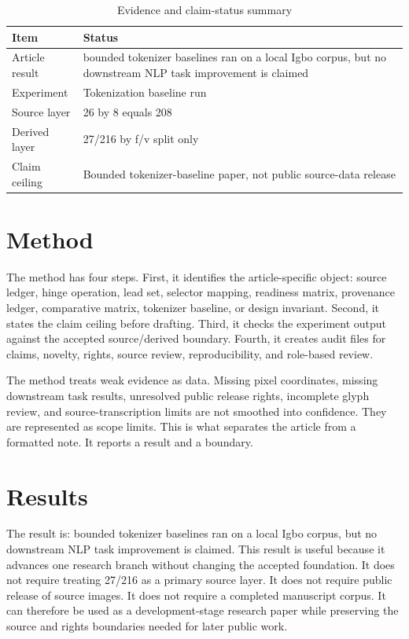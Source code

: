 \documentclass[sigconf,nonacm]{acmart}
\begin{document}
\begin{table}[t]
\caption{Evidence and claim-status summary}
\label{tab:article_na_009}
\begin{tabular}{p{}p{}}
\toprule
Item & Status \\
\midrule
Article result & bounded tokenizer baselines ran on a local Igbo corpus, but no downstream NLP task improvement is claimed \\
Experiment & Tokenization baseline run \\
Source layer & 26 by 8 equals 208 \\
Derived layer & 27/216 by f/v split only \\
Claim ceiling & Bounded tokenizer-baseline paper, not public source-data release \\
\bottomrule
\end{tabular}
\end{table}


\section{Method}
The method has four steps. First, it identifies the article-specific object:
source ledger, hinge operation, lead set, selector mapping, readiness matrix,
provenance ledger, comparative matrix, tokenizer baseline, or design invariant.
Second, it states the claim ceiling before drafting. Third, it checks the
experiment output against the accepted source/derived boundary. Fourth, it
creates audit files for claims, novelty, rights, source review, reproducibility,
and role-based review.

The method treats weak evidence as data. Missing pixel coordinates, missing
downstream task results, unresolved public release rights, incomplete glyph
review, and source-transcription limits are not smoothed into confidence. They
are represented as scope limits. This is what separates the article from a
formatted note. It reports a result and a boundary.

\section{Results}
The result is: bounded tokenizer baselines ran on a local Igbo corpus, but no downstream NLP task improvement is claimed. This result is useful because it advances one research
branch without changing the accepted foundation. It does not require treating
27/216 as a primary source layer. It does not require public release of source
images. It does not require a completed manuscript corpus. It can therefore be
used as a development-stage research paper while preserving the source and rights
boundaries needed for later public work.
\end{document}
